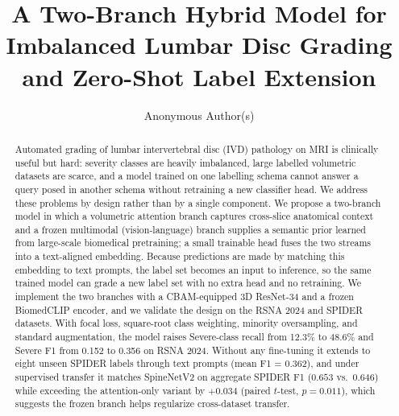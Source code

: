 \documentclass[runningheads]{llncs}
\begin{document}
%
\title{A Two-Branch Hybrid Model for Imbalanced Lumbar Disc Grading and Zero-Shot Label Extension}
%
%
%
\author{Anonymous Author(s)}
%
\maketitle
%
\begin{abstract}
Automated grading of lumbar intervertebral disc (IVD) pathology on MRI is clinically useful but hard: severity classes are heavily imbalanced, large labelled volumetric datasets are scarce, and a model trained on one labelling schema cannot answer a query posed in another schema without retraining a new classifier head. We address these problems by design rather than by a single component. We propose a two-branch model in which a volumetric attention branch captures cross-slice anatomical context and a frozen multimodal (vision-language) branch supplies a semantic prior learned from large-scale biomedical pretraining; a small trainable head fuses the two streams into a text-aligned embedding. Because predictions are made by matching this embedding to text prompts, the label set becomes an input to inference, so the same trained model can grade a new label set with no extra head and no retraining. We implement the two branches with a CBAM-equipped 3D ResNet-34 and a frozen BiomedCLIP encoder, and we validate the design on the RSNA 2024 and SPIDER datasets. With focal loss, square-root class weighting, minority oversampling, and standard augmentation, the model raises Severe-class recall from 12.3\% to 48.6\% and Severe F1 from 0.152 to 0.356 on RSNA 2024. Without any fine-tuning it extends to eight unseen SPIDER labels through text prompts (mean F1 = 0.362), and under supervised transfer it matches SpineNetV2 on aggregate SPIDER F1 ($0.653$ vs.\ $0.646$) while exceeding the attention-only variant by $+0.034$ (paired $t$-test, $p=0.011$), which suggests the frozen branch helps regularize cross-dataset transfer.

\end{abstract}
%
\end{document}
